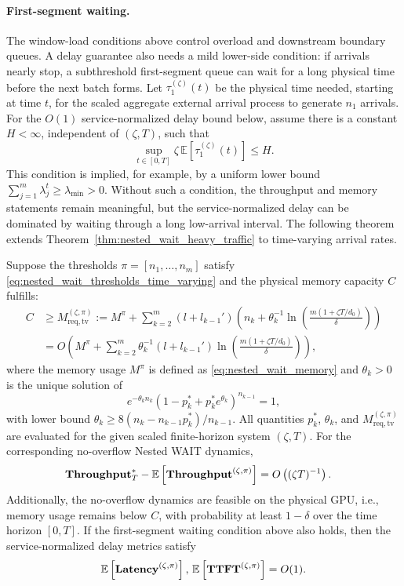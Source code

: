 \paragraph{First-segment waiting.}
The window-load conditions above control overload and downstream boundary queues. A delay guarantee also needs a mild lower-side condition: if arrivals nearly stop, a subthreshold first-segment queue can wait for a long physical time before the next batch forms. Let \(\tau_1^{(\zeta)}(t)\) be the physical time needed, starting at time \(t\), for the scaled aggregate external arrival process to generate \(n_1\) arrivals. For the \(O(1)\) service-normalized delay bound below, assume there is a constant \(H<\infty\), independent of \((\zeta,T)\), such that
\[
    \sup_{t\in[0,T]}\zeta\,\mathbb E[\tau_1^{(\zeta)}(t)]\le H .
\]
This condition is implied, for example, by a uniform lower bound \(\sum_{j=1}^m\lambda_j^t\ge\lambda_{\min}>0\). Without such a condition, the throughput and memory statements remain meaningful, but the service-normalized delay can be dominated by waiting through a long low-arrival interval.
The following theorem extends Theorem~\ref{thm:nested_wait_heavy_traffic} to time-varying arrival rates.

\begin{theorem}
\label{thm:nested_wait_heavy_traffic_time_varying}
Suppose the thresholds $\pi = [n_1, \dots, n_m]$ satisfy \eqref{eq:nested_wait_thresholds_time_varying} and the physical memory capacity \(C\) fulfills:
\[
\begin{aligned}
	C &\ge M_{\mathrm{req},\mathrm{tv}}^{(\zeta,\pi)}
	:= M^\pi + \sum_{k=2}^m (l + l_{k-1}') \left(n_k + \theta_k^{-1} \ln\!\left( \tfrac{m(1+\zeta T/d_0)}{\delta} \right)\right) \\
	    &= O\!\left( M^\pi + \sum_{k=2}^m \theta_k^{-1}  (l + l_{k-1}') \ln\!\left( \tfrac{m(1+\zeta T/d_0)}{\delta} \right) \right),
\end{aligned}
\]
where the memory usage $M^\pi$ is defined as \eqref{eq:nested_wait_memory} and \(\theta_k>0\) is the unique solution of
\[
    e^{-\theta_k n_k}(1-p_k^*+p_k^*e^{\theta_k})^{n_{k-1}}=1,
\]
with lower bound \(\theta_k\ge 8(n_k-n_{k-1}p_k^*)/n_{k-1}\).
All quantities \(p_k^*\), \(\theta_k\), and \(M_{\mathrm{req},\mathrm{tv}}^{(\zeta,\pi)}\) are evaluated for the given scaled finite-horizon system \((\zeta,T)\).
For the corresponding no-overflow Nested WAIT dynamics,
$$
    \begin{aligned}
        &\textbf{Throughput}_T^* - \mathbb{E}\left[ \textbf{Throughput}^{(\zeta, \pi)} \right]
   = O\left( (\zeta T)^{-1} \right).
    \end{aligned}
$$
Additionally, the no-overflow dynamics are feasible on the physical GPU, i.e., memory usage remains below \(C\), with probability at least $1 - \delta$ over the time horizon $[0,T].$
If the first-segment waiting condition above also holds, then the service-normalized delay metrics satisfy
\[
\mathbb{E}\left[ \textbf{Latency}^{(\zeta, \pi)} \right], \,\mathbb{E}\left[ \textbf{TTFT}^{(\zeta, \pi)} \right] = O(1).
\]
\end{theorem}

